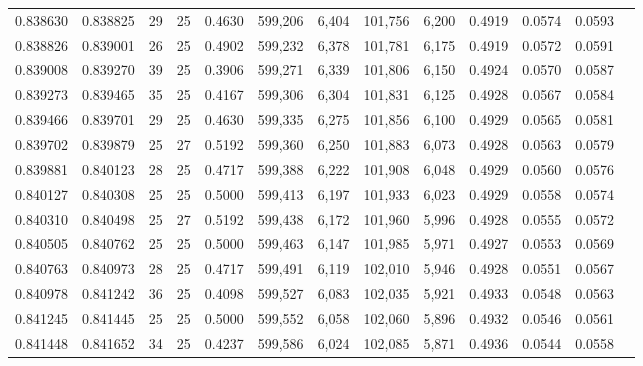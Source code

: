 \begin{tabular}{rrrrrrrrrrrrr}
0.838630 & 0.838825 &    29 &  25 &                                     0.4630 & 599,206 &   6,404 & 101,756 &   6,200 & 0.4919 & 0.0574 & 0.0593 \\
0.838826 & 0.839001 &    26 &  25 &                                     0.4902 & 599,232 &   6,378 & 101,781 &   6,175 & 0.4919 & 0.0572 & 0.0591 \\
0.839008 & 0.839270 &    39 &  25 &                                     0.3906 & 599,271 &   6,339 & 101,806 &   6,150 & 0.4924 & 0.0570 & 0.0587 \\
0.839273 & 0.839465 &    35 &  25 &                                     0.4167 & 599,306 &   6,304 & 101,831 &   6,125 & 0.4928 & 0.0567 & 0.0584 \\
0.839466 & 0.839701 &    29 &  25 &                                     0.4630 & 599,335 &   6,275 & 101,856 &   6,100 & 0.4929 & 0.0565 & 0.0581 \\
0.839702 & 0.839879 &    25 &  27 &                                     0.5192 & 599,360 &   6,250 & 101,883 &   6,073 & 0.4928 & 0.0563 & 0.0579 \\
0.839881 & 0.840123 &    28 &  25 &                                     0.4717 & 599,388 &   6,222 & 101,908 &   6,048 & 0.4929 & 0.0560 & 0.0576 \\
0.840127 & 0.840308 &    25 &  25 &                                     0.5000 & 599,413 &   6,197 & 101,933 &   6,023 & 0.4929 & 0.0558 & 0.0574 \\
0.840310 & 0.840498 &    25 &  27 &                                     0.5192 & 599,438 &   6,172 & 101,960 &   5,996 & 0.4928 & 0.0555 & 0.0572 \\
0.840505 & 0.840762 &    25 &  25 &                                     0.5000 & 599,463 &   6,147 & 101,985 &   5,971 & 0.4927 & 0.0553 & 0.0569 \\
0.840763 & 0.840973 &    28 &  25 &                                     0.4717 & 599,491 &   6,119 & 102,010 &   5,946 & 0.4928 & 0.0551 & 0.0567 \\
0.840978 & 0.841242 &    36 &  25 &                                     0.4098 & 599,527 &   6,083 & 102,035 &   5,921 & 0.4933 & 0.0548 & 0.0563 \\
0.841245 & 0.841445 &    25 &  25 &                                     0.5000 & 599,552 &   6,058 & 102,060 &   5,896 & 0.4932 & 0.0546 & 0.0561 \\
0.841448 & 0.841652 &    34 &  25 &                                     0.4237 & 599,586 &   6,024 & 102,085 &   5,871 & 0.4936 & 0.0544 & 0.0558 \\

\end{tabular}
